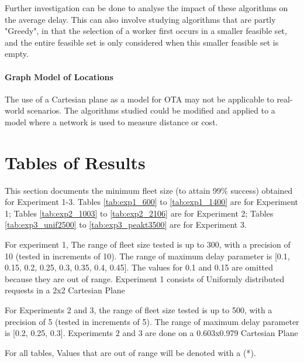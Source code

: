 \documentclass[urop]{socreport}
\begin{document}
Further investigation can be done to analyse the impact of these algorithms on the average delay. This can also involve studying algorithms that are partly "Greedy", in that the selection of a worker first occurs in a smaller feasible set, and the entire feasible set is only considered when this smaller feasible set is empty.

\subsubsection{Graph Model of Locations}
The use of a Cartesian plane as a model for OTA may not be applicable to real-world scenarios. The algorithms studied could be modified and applied to a model where a network is used to measure distance or cost.




\appendix
\chapter{Tables of Results}
\label{ch:appendixtables}
This section documents the minimum fleet size (to attain 99\% success) obtained for Experiment 1-3. Tables \ref{tab:exp1_600} to \ref{tab:exp1_1400} are for Experiment 1; Tables \ref{tab:exp2_1003} to \ref{tab:exp2_2106} are for Experiment 2; Tables \ref{tab:exp3_unif2500} to \ref{tab:exp3_peakt3500} are for Experiment 3.

For experiment 1, The range of fleet size tested is up to 300, with a precision of 10 (tested in increments of 10). The range of maximum delay parameter is [0.1, 0.15, 0.2, 0.25, 0.3, 0.35, 0.4, 0.45]. The values for 0.1 and 0.15 are omitted because they are out of range. Experiment 1 consists of Uniformly distributed requests in a 2x2 Cartesian Plane

For Experiments 2 and 3, the range of fleet size tested is up to 500, with a precision of 5 (tested in increments of 5). The range of maximum delay parameter is [0.2, 0.25, 0.3]. Experiments 2 and 3 are done on a  0.603x0.979 Cartesian Plane

For all tables, Values that are out of range will be denoted with a (*).
\end{document}
